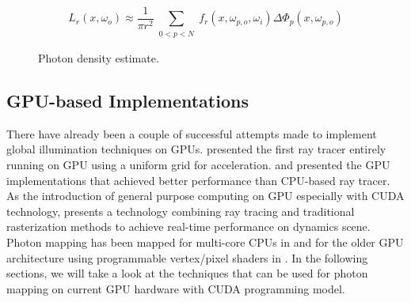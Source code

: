 \begin{equation}
L_r(x, \omega_{o}) \approx \frac{1}{\pi r^{2}}\sum_{\substack{0<p<N}}f_{r}(x, \omega_{p, o}, \omega_{i})\Delta \Phi_{p}(x,\omega_{p, o}) 
\label{eq:photon_estimate}
\end{equation} 

\begin{figure}[ftp] 
    \centering 
    \renewcommand{\thefigure}{\thechapter.\arabic{figure}}
    \caption[]{Photon density estimate.}
    \label{fig:photon_density_estimate} 
\end{figure} 

\subsection{GPU-based Implementations}
There have already been a couple of successful attempts made to implement global illumination techniques on GPUs. \citeauthor{Purcell:2002:RTP:566654.566640}\cite{Purcell:2002:RTP:566654.566640} presented the first ray tracer entirely running on GPU using a uniform grid for acceleration. \cite{Horn:2007:IKT:1230100.1230129} and \cite{Popov2007} presented the GPU implementations that achieved better performance than CPU-based ray tracer. As the introduction of general purpose computing on GPU especially with CUDA technology, \citeauthor{Luebke2008} \cite{Luebke2008} presents a technology combining ray tracing and traditional rasterization methods to achieve real-time performance on dynamics scene. Photon mapping has been mapped for multi-core CPUs in \cite{günther:realtime} and for the older GPU architecture using programmable vertex/pixel shaders in \cite{Purcell:2005:PMP:1198555.1198797}. In the following sections, we will take a look at the techniques that can
be used for photon mapping on current GPU hardware with CUDA programming model.  

